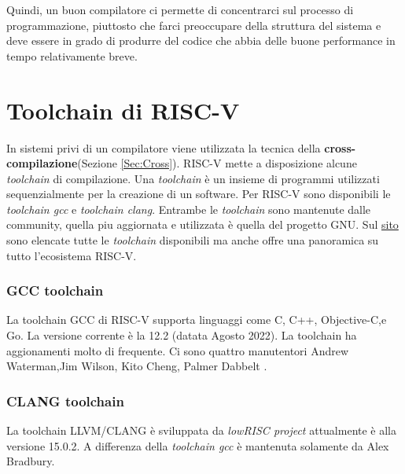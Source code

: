 \documentclass[12pt,a4paper]{report}
\begin{document}
Quindi, un buon compilatore ci permette di concentrarci sul processo di programmazione,  piuttosto che farci preoccupare della struttura del sistema e deve essere in grado di produrre del codice che abbia delle buone performance in tempo relativamente breve.


\section{Toolchain di RISC-V}
In sistemi privi di un compilatore viene utilizzata la tecnica della \textbf{cross-compilazione}(Sezione \ref{Sec:Cross}).  RISC-V mette a disposizione alcune \textit{toolchain} di compilazione. Una \textit{toolchain} è un insieme di programmi utilizzati sequenzialmente per la creazione di un software. Per RISC-V sono disponibili le \textit{toolchain gcc}\cite{toolchain_gcc} e \textit{toolchain clang}\cite{toolchain_clang}. Entrambe le \textit{toolchain} sono mantenute dalle community, quella piu aggiornata e utilizzata è quella del progetto GNU.  Sul \href{https://wiki.riscv.org/display/HOME/RISC-V+Software+Ecosystem}{sito} sono elencate tutte le \textit{toolchain} disponibili ma anche offre una panoramica su tutto l'ecosistema RISC-V.


\subsubsection{GCC toolchain}
La toolchain GCC di RISC-V supporta linguaggi come C, C++, Objective-C,e Go. La versione corrente è la 12.2 (datata Agosto 2022).  La toolchain ha aggionamenti molto di frequente.  Ci sono quattro manutentori Andrew Waterman,Jim Wilson, Kito Cheng, Palmer Dabbelt .

\subsubsection{CLANG toolchain}
La toolchain LLVM/CLANG è sviluppata da \textit{lowRISC project} attualmente è alla versione 15.0.2. A differenza della \textit{toolchain gcc} è mantenuta solamente da Alex Bradbury.


\end{document}
